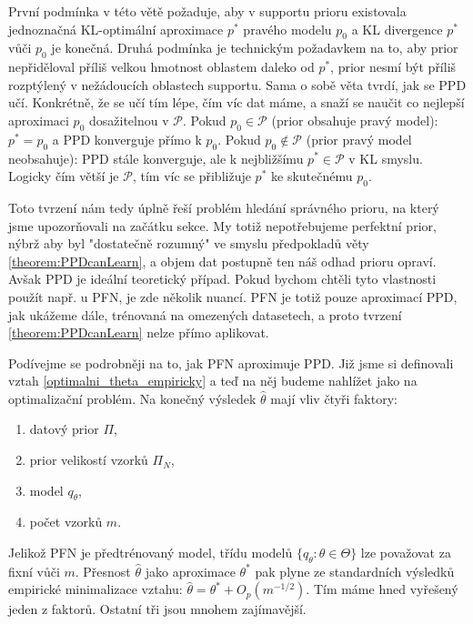 První podmínka v této větě požaduje, aby v supportu prioru existovala jednoznačná KL-optimální aproximace $p^*$ pravého modelu $p_0$ a KL divergence $p^*$ vůči $p_0$ je konečná.
Druhá podmínka je technickým požadavkem na to, aby prior nepřiděloval příliš velkou hmotnost oblastem daleko od $p^*$, prior nesmí být příliš rozptýlený v nežádoucích oblastech supportu.
Sama o sobě věta tvrdí, jak se PPD učí.
Konkrétně, že se učí tím lépe, čím víc dat máme, a snaží se naučit co nejlepší aproximaci $p_0$ dosažitelnou v $\mathcal{P}$.
Pokud $p_0 \in \mathcal{P}$ (prior obsahuje pravý model): $p^* = p_0$ a PPD konverguje přímo k $p_0$.
Pokud $p_0 \notin \mathcal{P}$ (prior pravý model neobsahuje): PPD stále konverguje, ale k nejbližšímu $p^* \in \mathcal{P}$ v KL smyslu.
Logicky čím větší je $\mathcal{P}$, tím víc se přibližuje $p^*$ ke skutečnému $p_0$.
\par   

Toto tvrzení nám tedy úplně řeší problém hledání správného prioru, na který jsme upozorňovali na začátku sekce.
My totiž nepotřebujeme perfektní prior, nýbrž aby byl "dostatečně rozumný" ve smyslu předpokladů věty \ref{theorem:PPDcanLearn}, a objem dat postupně ten náš odhad prioru opraví.
Avšak PPD je ideální teoretický případ.
Pokud bychom chtěli tyto vlastnosti použít např. u PFN, je zde několik nuancí. 
PFN je totiž pouze aproximací PPD, jak ukážeme dále, trénovaná na omezených datasetech, a proto tvrzení \ref{theorem:PPDcanLearn} nelze přímo aplikovat. 
\par   

Podívejme se podrobněji na to, jak PFN aproximuje PPD.
Již jsme si definovali vztah \ref{optimalni_theta_empiricky} a teď na něj budeme nahlížet jako na optimalizační problém.
Na konečný výsledek $\hat{\theta}$ mají vliv čtyři faktory:
\begin{enumerate}
    \item datový prior $\Pi$,
    \item prior velikostí vzorků $\Pi_N$,
    \item model $q_{\theta}$,
    \item počet vzorků $m$.
\end{enumerate}

Jelikož PFN je předtrénovaný model, třídu modelů $\{q_\theta : \theta \in \Theta\}$ lze považovat za fixní vůči $m$.
Přesnost $\hat{\theta}$ jako aproximace $\theta^*$ pak plyne ze standardních výsledků empirické minimalizace vztahu: $\hat{\theta} = \theta^* + O_p(m^{-1/2})$.
Tím máme hned vyřešený jeden z faktorů.
Ostatní tři jsou mnohem zajímavější.
\par   

